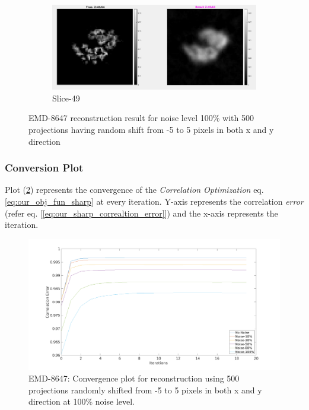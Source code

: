 \documentclass[twoside]{iitbreport}
\begin{document}
\begin{figure}[H]
\begin{subfigure}{1\textwidth}
\centering
\includegraphics[width=0.8\linewidth]{emd_8647_result_sharp_4.png}
\captionsetup{justification=centering}
\caption{ Slice-49 }
\end{subfigure} 
\captionsetup{justification=centering}
\caption{EMD-8647 reconstruction result for noise level 100\%  with 500 projections having random shift from -5 to 5 pixels in both x and y direction}
\label{fig:EMD-8647 Reconstruction: Result-noise-100-shift-5}
\end{figure}

\subsubsection{Conversion Plot}

Plot (\ref{figplot:emd_8647_result_shift-Bm3d_convergence}) represents the convergence of the \textit{Correlation Optimization} eq. \ref{eq:our_obj_fun_sharp} at every iteration. Y-axis represents the correlation \textit{error} (refer eq. [\ref{eq:our_sharp_correaltion_error}]) and the x-axis represents the iteration.

\begin{figure}[H]
\includegraphics[width=1\textwidth]{emd_8647_result_shift_5_Bm3d_convergence.png}
\centering
\captionsetup{justification=centering}
\caption{EMD-8647: Convergence plot for reconstruction using 500  projections randomly shifted from -5 to 5 pixels in both x and y direction at 100\% noise level. }
\label{figplot:emd_8647_result_shift-Bm3d_convergence}
\end{figure}
\end{document}
